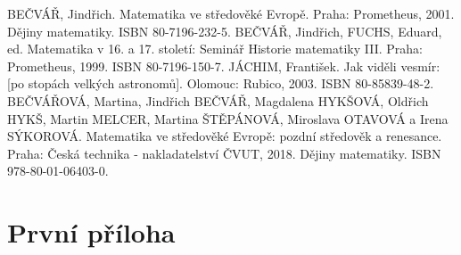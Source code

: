 \documentclass[rocnikovka]{gzwroc} %
\begin{document}
\begin{oldthebibliography}{99}
BEČVÁŘ, Jindřich. Matematika ve středověké Evropě. Praha: Prometheus, 2001. Dějiny matematiky. ISBN 80-7196-232-5.
BEČVÁŘ, Jindřich, FUCHS, Eduard, ed. Matematika v 16. a 17. století: Seminář Historie matematiky III. Praha: Prometheus, 1999. ISBN 80-7196-150-7.
JÁCHIM, František. Jak viděli vesmír: [po stopách velkých astronomů]. Olomouc: Rubico, 2003. ISBN 80-85839-48-2.
BEČVÁŘOVÁ, Martina, Jindřich BEČVÁŘ, Magdalena HYKŠOVÁ, Oldřich HYKŠ, Martin MELCER, Martina ŠTĚPÁNOVÁ, Miroslava OTAVOVÁ a Irena SÝKOROVÁ. Matematika ve středověké Evropě: pozdní středověk a renesance. Praha: Česká technika - nakladatelství ČVUT, 2018. Dějiny matematiky. ISBN 978-80-01-06403-0.
\end{oldthebibliography}
\newpage
\listoffigures
\listoftables
\newpage
\prilohy
\section{První příloha} %
\end{document}
